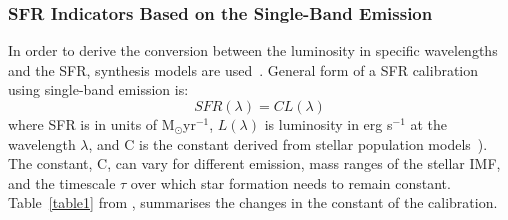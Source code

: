 \subsubsection*{SFR Indicators Based on the Single-Band Emission}

In order to derive the conversion between the luminosity in specific wavelengths and the SFR, synthesis models are used~\citep{Kennicutt98b}. 
General form of a SFR calibration using single-band emission is: 
\begin{equation}
\label{equ: sfrsingle}
SFR(\lambda)= CL(\lambda)
\end{equation}
where SFR is in units of M${_\odot}$yr$^{-1}$, $L(\lambda)$ is luminosity in erg s$^{-1}$ at the wavelength $\lambda$, and C is the constant derived from stellar population models~\citep[e.g, starburst99][]{Leitherer99}). 
The constant, C, can vary for different emission, mass ranges of the stellar IMF, and the timescale $\tau$ over which star formation needs to remain constant. 
Table~\ref{table1} from \cite{Calzetti13}, summarises the changes in the constant of the calibration. 

